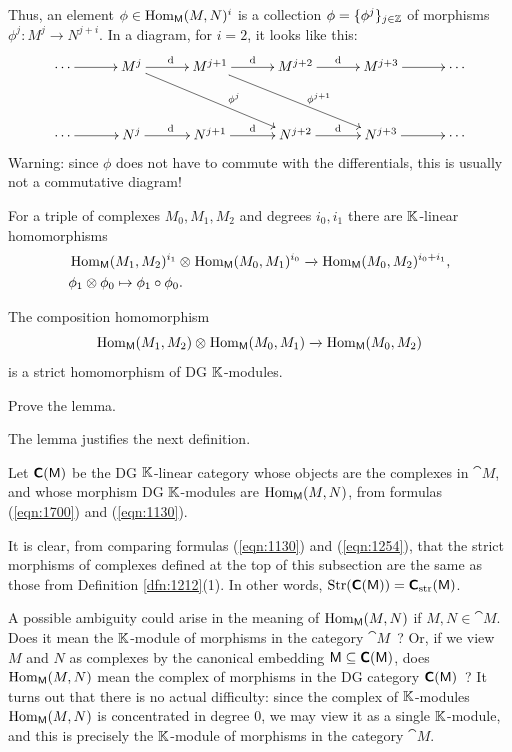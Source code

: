 Thus, an element $\phi \in \operatorname{Hom}_{\operatorname{\mathsf{M}}}(M, N)^i$
is a collection $\phi = \{ \phi^j \}_{j \in \mathbb{Z}}$ of morphisms 
$\phi^j : M^j \to N^{j + i}$. In a diagram, for $i = 2$, it looks like this:
\[ \UseTips  \xymatrix @C=7ex @R=8ex {
\cdots 
\ar[r]
&
M^j
\ar[r]^{\d}
\ar[drr]^(0.6){\phi^j}
&
M^{j+1}
\ar[r]^{\d}
\ar[drr]^(0.6){\phi^{j+1}}
&
M^{j + 2}
\ar[r]^{\d}
&
M^{j + 3}
\ar[r]
&
\cdots
\\
\cdots 
\ar[r]
&
N^j
\ar[r]^{\d}
&
N^{j + 1}
\ar[r]^{\d}
&
N^{j + 2}
\ar[r]^{\d}
&
N^{j + 3}
\ar[r]
&
\cdots 
} \]
Warning: since $\phi$ does not have to commute with the differentials, this is 
usually not a commutative diagram! 

For a triple of complexes $M_0, M_1, M_2$ and degrees $i_0, i_1$ there are 
$\mathbb{K}$-linear homomorphisms
\[ \begin{aligned}
& 
\operatorname{Hom}_{\operatorname{\mathsf{M}}}(M_1, M_2)^{i_1} \otimes_{} 
\operatorname{Hom}_{\operatorname{\mathsf{M}}}(M_0, M_1)^{i_0} \xrightarrow{} 
\operatorname{Hom}_{\operatorname{\mathsf{M}}}(M_0, M_2)^{i_0 + i_1} ,
\\
&
\phi_1 \otimes \phi_0 \mapsto \phi_1 \circ \phi_0 . 
\end{aligned} \]

\begin{lem} \label{1213}
The composition homomorphism 
\[ \operatorname{Hom}_{\operatorname{\mathsf{M}}}(M_1, M_2) \otimes_{} 
\operatorname{Hom}_{\operatorname{\mathsf{M}}}(M_0, M_1) \xrightarrow{} 
\operatorname{Hom}_{\operatorname{\mathsf{M}}}(M_0, M_2) \]
is a strict homomorphism of DG $\mathbb{K}$-modules. 
\end{lem}

\begin{exer}
Prove the lemma. 
\end{exer}

The lemma justifies the next definition.

\begin{dfn}
Let $\boldsymbol{\mathsf{C}}(\operatorname{\mathsf{M}})$%
be the DG $\mathbb{K}$-linear category whose objects are the 
complexes in $\cat{M}$, and whose morphism DG $\mathbb{K}$-modules are 
$\operatorname{Hom}_{\operatorname{\mathsf{M}}}(M, N)$, from formulas (\ref{eqn:1700}) and 
(\ref{eqn:1130}).  
\end{dfn}

It is clear, from comparing formulas (\ref{eqn:1130}) and (\ref{eqn:1254}), 
that the strict morphisms of complexes defined at the top of this subsection 
are the same as those from Definition \ref{dfn:1212}(1). In other words, 
$\operatorname{Str}(\boldsymbol{\mathsf{C}}(\operatorname{\mathsf{M}})) = \boldsymbol{\mathsf{C}}_{\mathrm{str}}(\operatorname{\mathsf{M}})$.

\begin{rem}
A possible ambiguity could arise in the meaning of 
$\operatorname{Hom}_{\operatorname{\mathsf{M}}}(M, N)$ 
if $M, N \in \cat{M}$. Does it mean the $\mathbb{K}$-module of morphisms in the 
category $\cat{M}$~? Or, if we view $M$ and $N$ as complexes by the canonical
embedding $\operatorname{\mathsf{M}} \subseteq \boldsymbol{\mathsf{C}}(\operatorname{\mathsf{M}})$, does 
$\operatorname{Hom}_{\operatorname{\mathsf{M}}}(M, N)$
mean the complex of morphisms in the DG category $\boldsymbol{\mathsf{C}}(\operatorname{\mathsf{M}})$~? 
It turns out that there is no actual difficulty: since the complex of 
$\mathbb{K}$-modules $\operatorname{Hom}_{\operatorname{\mathsf{M}}}(M, N)$ is concentrated in degree $0$, 
we may view it as a single $\mathbb{K}$-module, and this is precisely the $\mathbb{K}$-module 
of 
morphisms in the category $\cat{M}$.
\end{rem}

